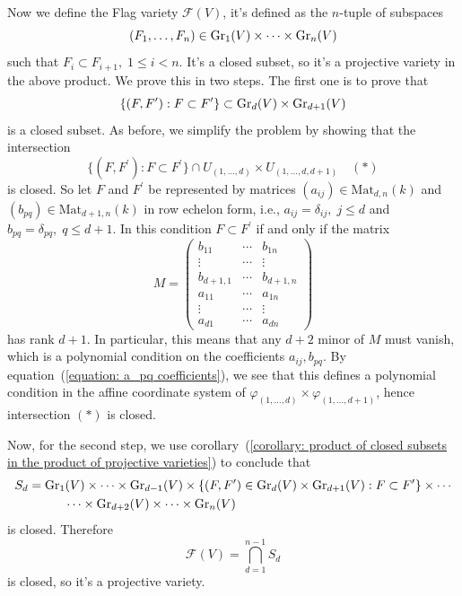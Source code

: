 Now we define the Flag variety $\mathcal{F}(V)$, it's defined as the $n$-tuple of subspaces  
\begin{equation}
    (F_1,\dots, F_n)\in \text{Gr}_1(V)\times\cdots\times \text{Gr}_n(V)
\end{equation}
such that $F_i\subset F_{i+1},\;1\leq i<n$. It's a closed subset, so it's a projective variety in the above product. 
We prove this in two steps. The first one is to prove that 
\begin{equation}
    \{(F,F^\prime):F\subset F^\prime\}\subset \text{Gr}_d(V)\times\text{Gr}_{d+1}(V)
\end{equation}
is a closed subset. As before, we simplify the problem by showing that the intersection 
\begin{equation}
     \{(F,F^\prime):F\subset F^\prime\}\cap U_{(1,\dots,d)}\times U_{(1,\dots,d,d+1)}\quad(*)
\end{equation}
is closed. So let $F$ and $F^\prime$ be represented by matrices $(a_{ij})\in\text{Mat}_{d,n}(k)$ and 
$(b_{pq})\in\text{Mat}_{d+1,n}(k)$ in row echelon form, i.e., 
$a_{ij}=\delta_{ij},\;j\leq d$ and $b_{pq}=\delta_{pq},\;q\leq d+1$. In this condition 
$F\subset F^\prime$ if and only if the matrix 
\begin{equation}
   M= \begin{pmatrix}
        b_{11}&\cdots& b_{1n}\\
        \vdots&\cdots&\vdots\\
        b_{d+1,1}&\cdots&b_{d+1,n}\\
        a_{11}&\cdots&a_{1n}\\
        \vdots&\cdots&\vdots\\
        a_{d1}&\cdots&a_{dn}
    \end{pmatrix}
\end{equation}
has rank $d+1$. In particular, this means that any $d+2$ minor of $M$ must vanish, which is a polynomial condition 
on the coefficients $a_{ij}, b_{pq}$. By equation~(\ref{equation: a_pq coefficients}), we see that this 
defines a polynomial condition in the affine coordinate system of $\varphi_{(1,\dots,d)}\times\varphi_{(1,\dots,d+1)}$, hence 
intersection $(*)$ is closed.\par 

Now, for the second step, we use corollary~(\ref{corollary: product of closed subsets in the product of projective varieties}) 
to conclude that 
\begin{equation}
    \begin{split}
&S_{d} = \text{Gr}_1(V)\times\cdots\times\text{Gr}_{d-1}(V)\times\{(F,F^\prime)\in\text{Gr}_d(V)\times \text{Gr}_{d+1}(V):F\subset F^\prime\}\times\cdots\\
&\quad\quad\quad\quad\cdots\times\text{Gr}_{d+2}(V)\times\cdots\times \text{Gr}_n(V) 
    \end{split}
\end{equation}
is closed. Therefore 
\begin{equation}
    \mathcal{F}(V) = \bigcap_{d=1}^{n-1}S_{d}
\end{equation}
is closed, so it's a projective variety.\par 

